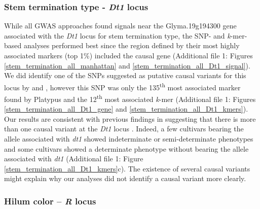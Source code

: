 \subsubsection*{Stem termination type - \textit{Dt1} locus}
\label{sv-gwas-main-results-stem-termination-dt1}

While all GWAS approaches found signals near the Glyma.19g194300 gene
associated with the \textit{Dt1} locus for stem termination type, the SNP- and
\textit{k}-mer-based analyses performed best since the region defined by their
most highly associated markers (top 1\%) included the causal gene (Additional file 1: Figures
\ref{stem_termination_all_manhattan} and \ref{stem_termination_all_Dt1_signal}).
We did identify one of the SNPs suggested as putative causal variants for this
locus by \cite{tian2010} and \cite{liu2010}, however this SNP was only the
135\textsuperscript{th} most associated marker found by Platypus and the
12\textsuperscript{th} most associated \emph{k}-mer (Additional file 1: Figures
\ref{stem_termination_all_Dt1_gene} and \ref{stem_termination_all_Dt1_kmers}).
Our results are consistent with previous findings in suggesting that there is
more than one causal variant at the \textit{Dt1} locus \citep{liu2010,
tian2010}. Indeed, a few cultivars bearing the allele associated with
\emph{dt1} showed indeterminate or semi-determinate phenotypes and some
cultivars showed a determinate phenotype without bearing the allele associated
with \emph{dt1} (Additional file 1: Figure \ref{stem_termination_all_Dt1_kmers}c). The existence of
several causal variants might explain why our analyses did not identify a
causal variant more clearly.

\subsubsection*{Hilum color -- \textit{R} locus}
\label{sv-gwas-main-results-hilum-color-r}

